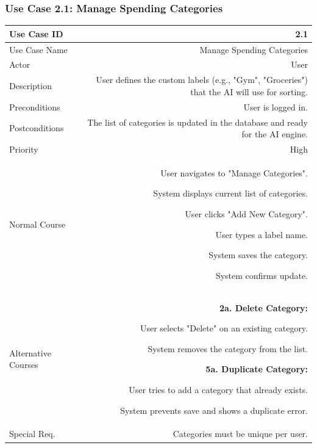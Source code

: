 \subsubsection{Use Case 2.1: Manage Spending Categories}
\begin{tabularx}{\textwidth}{|L|R|}
	\hline
	Use Case ID & 2.1 \\ \hline
	Use Case Name & Manage Spending Categories \\ \hline
	Actor & User \\ \hline
	Description & User defines the custom labels (e.g., "Gym", "Groceries") that the AI will use for sorting. \\ \hline
	Preconditions & User is logged in. \\ \hline
	Postconditions & The list of categories is updated in the database and ready for the AI engine. \\ \hline
	Priority & High \\ \hline
	Normal Course & 
	\begin{normalsteps}
		\item User navigates to "Manage Categories".
		\item System displays current list of categories.
		\item User clicks "Add New Category".
		\item User types a label name.
		\item System saves the category.
		\item System confirms update.
	\end{normalsteps} \\ \hline
	Alternative Courses & 
	\textbf{2a. Delete Category:} 
	\begin{altsteps}
		\item User selects "Delete" on an existing category.
		\item System removes the category from the list.
	\end{altsteps}
	\textbf{5a. Duplicate Category:} 
	\begin{altsteps}
		\item User tries to add a category that already exists.
		\item System prevents save and shows a duplicate error.
	\end{altsteps} \\ \hline
	Special Req. & Categories must be unique per user. \\ \hline
\end{tabularx}

